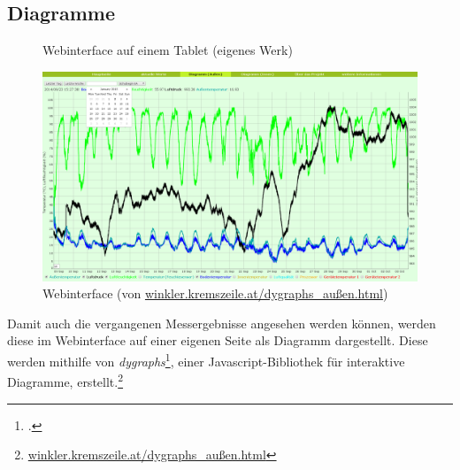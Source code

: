\subsection{Diagramme}
\label{subsec:Diagramme}

\begin{figure}[h]
  \centering
  \caption{Webinterface auf einem Tablet (eigenes Werk)}
  \label{fig:dygraphs_tablet}
\end{figure}

\begin{figure}[h]
  \centering
     \includegraphics[width=\textwidth]{figures/dygraphs.png}
  \caption{Webinterface (von \href{http://winkler.kremszeile.at/dygraphs\_au\%C3\%9Fen.html}{winkler.kremszeile.at/dygraphs\_außen.html})}
  \label{fig:dygraphs}
\end{figure}
Damit auch die vergangenen Messergebnisse angesehen werden können, werden diese im Webinterface auf einer eigenen Seite als Diagramm dargestellt. Diese werden mithilfe von \emph{dygraphs}\footcite{dygraphs}, einer \gls{Javascript}-Bibliothek für interaktive Diagramme, erstellt.\footnote{\href{http://winkler.kremszeile.at/dygraphs_au\%C3\%9Fen.html}{winkler.kremszeile.at/dygraphs\_außen.html}}

